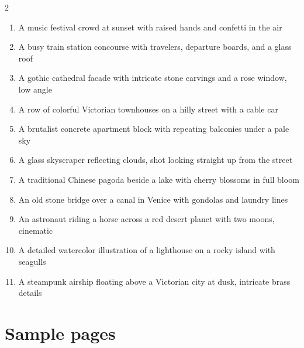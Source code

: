 {\begin{multicols}{2}
\begin{enumerate}[leftmargin=2.1em,itemsep=0pt,topsep=0pt,parsep=0pt]
  \item A music festival crowd at sunset with raised hands and confetti in the air
  \item A busy train station concourse with travelers, departure boards, and a glass roof
  \item A gothic cathedral facade with intricate stone carvings and a rose window, low angle
  \item A row of colorful Victorian townhouses on a hilly street with a cable car
  \item A brutalist concrete apartment block with repeating balconies under a pale sky
  \item A glass skyscraper reflecting clouds, shot looking straight up from the street
  \item A traditional Chinese pagoda beside a lake with cherry blossoms in full bloom
  \item An old stone bridge over a canal in Venice with gondolas and laundry lines
  \item An astronaut riding a horse across a red desert planet with two moons, cinematic
  \item A detailed watercolor illustration of a lighthouse on a rocky island with seagulls
  \item A steampunk airship floating above a Victorian city at dusk, intricate brass details
\end{enumerate}
\end{multicols}}

\fi
\ifshortversion\FloatBarrier\fi
\section{Sample pages}
\label{app:galleries}

